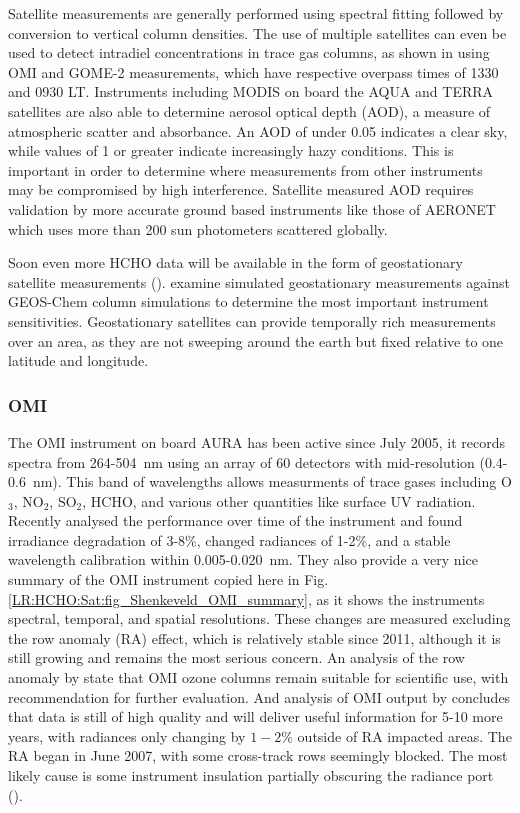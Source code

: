     Satellite measurements are generally performed using spectral fitting followed by conversion to vertical column densities.
    The use of multiple satellites can even be used to detect intradiel concentrations in trace gas columns, as shown in \cite{Stavrakou2015} using OMI and GOME-2 measurements, which have respective overpass times of 1330 and 0930 LT.
    Instruments including MODIS on board the AQUA and TERRA satellites are also able to determine aerosol optical depth (AOD), a measure of atmospheric scatter and absorbance. 
    An AOD of under 0.05 indicates a clear sky, while values of 1 or greater indicate increasingly hazy conditions.
    This is important in order to determine where measurements from other instruments may be compromised by high interference.
    Satellite measured AOD requires validation by more accurate ground based instruments like those of AERONET which uses more than 200 sun photometers scattered globally.
    
    Soon even more HCHO data will be available in the form of geostationary satellite measurements (\cite{Kwon2017}).
    \cite{Kwon2017} examine simulated geostationary measurements against GEOS-Chem column simulations to determine the most important instrument sensitivities.
    Geostationary satellites can provide temporally rich measurements over an area, as they are not sweeping around the earth but fixed relative to one latitude and longitude.
    
    \subsubsection{OMI}
    
      The OMI instrument on board AURA has been active since July 2005, it records spectra from 264-504~nm using an array of 60 detectors with mid-resolution (0.4-0.6~nm).
      This band of wavelengths allows measurments of trace gases including O$_3$, NO$_2$, SO$_2$, HCHO, and various other quantities like surface UV radiation.
      Recently \cite{Schenkeveld2017} analysed the performance over time of the instrument and found irradiance degradation of 3-8\%, changed radiances of 1-2\%, and a stable wavelength calibration within 0.005-0.020~nm.
      They also provide a very nice summary of the OMI instrument copied here in Fig. \ref{LR:HCHO:Sat:fig_Shenkeveld_OMI_summary}, as it shows the instruments spectral, temporal, and spatial resolutions.
      These changes are measured excluding the row anomaly (RA) effect, which is relatively stable since 2011, although it is still growing and remains the most serious concern.
      An analysis of the row anomaly by \cite{Huang2017} state that OMI ozone columns remain suitable for scientific use, with recommendation for further evaluation.
      And analysis of OMI output by \cite{Schenkeveld2017} concludes that data is still of high quality and will deliver useful information for 5-10 more years, with radiances only changing by $1-2\%$ outside of RA impacted areas.
      The RA began in June 2007, with some cross-track rows seemingly blocked. The most likely cause is some instrument insulation partially obscuring the radiance port (\cite{Schenkeveld2017}).
      
